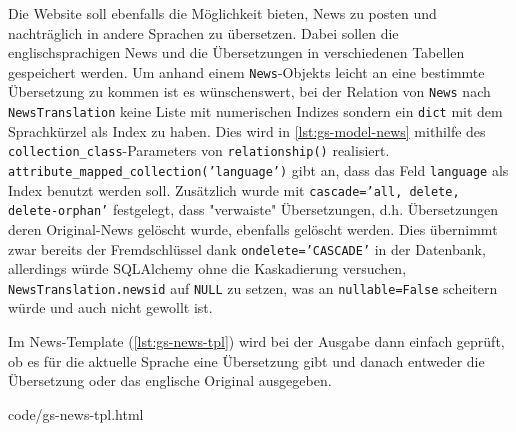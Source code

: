 Die Website soll ebenfalls die Möglichkeit bieten, News zu posten und
nachträglich in andere Sprachen zu übersetzen. Dabei sollen die
englischsprachigen News und die Übersetzungen in verschiedenen Tabellen
gespeichert werden. Um anhand einem \texttt{News}-Objekts leicht an eine
bestimmte Übersetzung zu kommen ist es wünschenswert, bei der Relation von
\texttt{News} nach \texttt{NewsTranslation} keine Liste mit numerischen Indizes
sondern ein \texttt{dict} mit dem Sprachkürzel als Index zu haben. Dies wird in
\autoref{lst:gs-model-news} mithilfe des \texttt{collection\_class}-Parameters
von \texttt{relationship()} realisiert.
\texttt{attribute\_mapped\_collection('language')} gibt an, dass das Feld
\texttt{language} als Index benutzt werden soll. Zusätzlich wurde mit
\texttt{cascade='all, delete, delete-orphan'} festgelegt, dass "verwaiste"
Übersetzungen, d.h. Übersetzungen deren Original-News gelöscht wurde, ebenfalls
gelöscht werden. Dies übernimmt zwar bereits der Fremdschlüssel dank
\texttt{ondelete='CASCADE'} in der Datenbank, allerdings würde SQLAlchemy ohne
die Kaskadierung versuchen, \texttt{NewsTranslation.newsid} auf \texttt{NULL} zu
setzen, was an \texttt{nullable=False} scheitern würde und auch nicht gewollt
ist.



Im News-Template (\autoref{lst:gs-news-tpl}) wird bei der Ausgabe dann einfach
geprüft, ob es für die aktuelle Sprache eine Übersetzung gibt und danach
entweder die Übersetzung oder das englische Original ausgegeben.


{code/gs-news-tpl.html}
